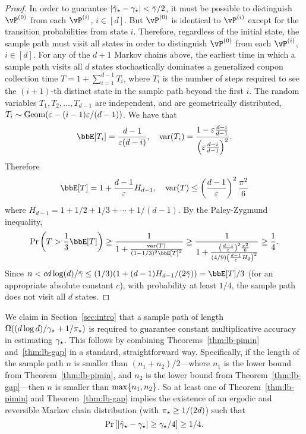 \begin{proof}
  In order to guarantee $|\hat\gamma_{\star} - \gamma_{\star}| < \bar\gamma/2$, it must
  be possible to distinguish $\vP^{(0)}$ from each $\vP^{(i)}$,
  $i\in[d]$.
  But $\vP^{(0)}$ is identical to $\vP^{(i)}$ except for the transition
  probabilities from state $i$.
  Therefore, regardless of the initial state, the sample path must
  visit all states in order to distinguish $\vP^{(0)}$ from each
  $\vP^{(i)}$, $i \in [d]$.
  For any of the $d+1$ Markov chains above, the earliest time in which
  a sample path visits all $d$ states
  stochastically dominates a generalized coupon collection time $T = 1 +
  \sum_{i=1}^{d-1} T_i$, where $T_i$ is the number of steps required to
  see the $(i+1)$-th distinct state in the sample path beyond the first
  $i$.
  The random variables $T_1,T_2,\dotsc,T_{d-1}$ are independent, and are
  geometrically distributed, $T_i \sim \operatorname{Geom}(\varepsilon -
  (i-1)\varepsilon/(d-1))$.
  We have that
  \[
    \bbE[T_i] = \frac{d-1}{\veps(d-i)} , \quad
    \var(T_i) = \frac{1 - \veps \frac{d-i}{d-1}}{%
      \Parens{ \veps \frac{d-i}{d-1} }^2
    }
    .
  \]
  Therefore
  \[
    \bbE[T] = 1 + \frac{d-1}{\veps} H_{d-1} , \quad
    \var(T) \leq \Parens{ \frac{d-1}{\veps} }^2 \frac{\pi^2}{6} 
  \]
  where $H_{d-1} = 1 + 1/2 + 1/3 + \dotsb + 1/(d-1)$.
  By the Paley-Zygmund inequality,
  \[
    \Pr\Parens{ T > \frac13\bbE[T] }
    \geq \frac{1}{1 + \frac{\var(T)}{(1-1/3)^2\bbE[T]^2}}
    \geq \frac{1}{1 + \frac{\Parens{ \frac{d-1}{\veps} }^2
    \frac{\pi^2}{6}}{(4/9)\Parens{ \frac{d-1}{\veps} H_2}^2}}
    \geq \frac14
    .
  \]
  Since $n < c d\log(d) / \bar\gamma \leq (1/3) (1 + (d-1) H_{d-1} /
  (2\bar\gamma)) = \bbE[T]/3$ (for an appropriate absolute constant
  $c$), with probability at least $1/4$, the sample path does not
  visit all $d$ states.
\end{proof}

We claim in Section~\ref{sec:intro} that a sample path of length
$\Omega( (d \log d)/\gamma_{\star} + 1/\pi_{\star})$ is required to guarantee
constant multiplicative accuracy in estimating $\gamma_{\star}$.
This follows by combining Theorems~\ref{thm:lb-pimin}
and~\ref{thm:lb-gap} in a standard, straightforward way.
Specifically, if the length of the sample path $n$ is smaller than
$(n_1 + n_2) / 2$---where $n_1$ is the lower bound from
Theorem~\ref{thm:lb-pimin}, and $n_2$ is the lower bound from
Theorem~\ref{thm:lb-gap}---then $n$ is smaller than
$\max\{n_1,n_2\}$.
So at least one of Theorem~\ref{thm:lb-pimin} and
Theorem~\ref{thm:lb-gap} implies the existence of an ergodic and
reversible Markov chain distribution (with $\pi_{\star} \geq 1/(2d)$) such that
\[
  \Pr\left[ |\hat\gamma_{\star} - \gamma_{\star}| \geq \gamma_{\star}/4 \right] \geq 1/4
  .
\]

